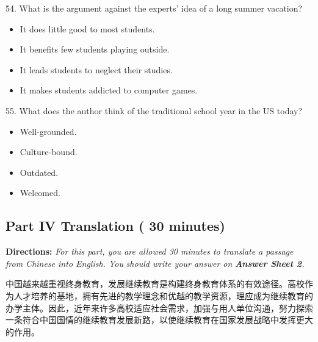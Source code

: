 \documentclass[UTF8,11pt]{ctexart}
\begin{document}
54. What is the argument against the experts’ idea of a long summer vacation?


\begin{itemize}[leftmargin=2em,itemsep=.2em,topsep=.4em]\item[A.] It does little good to most students.
\item[B.] It benefits few students playing outside.
\item[C.] It leads students to neglect their studies.
\item[D.] It makes students addicted to computer games.
\end{itemize}

55. What does the author think of the traditional school year in the US today?


\begin{itemize}[leftmargin=2em,itemsep=.2em,topsep=.4em]\item[A.] Well-grounded.
\item[B.] Culture-bound.
\item[C.] Outdated.
\item[D.] Welcomed.
\end{itemize}

\subsection*{\textbf{Part IV Translation} \textbf{( 30 minutes)}}


\textbf{Directions: }\textit{For this part, you are allowed 30 minutes to translate a passage from Chinese into English. You} \textit{should write your answer on }\textbf{\textit{Answer Sheet 2}}\textit{.}


中国越来越重视终身教育，发展继续教育是构建终身教育体系的有效途径。高校作为人才培养的基地，拥有先进的教学理念和优越的教学资源，理应成为继续教育的办学主体。因此，近年来许多高校适应社会需求，加强与用人单位沟通，努力探索一条符合中国国情的继续教育发展新路，以使继续教育在国家发展战略中发挥更大的作用。
\end{document}
